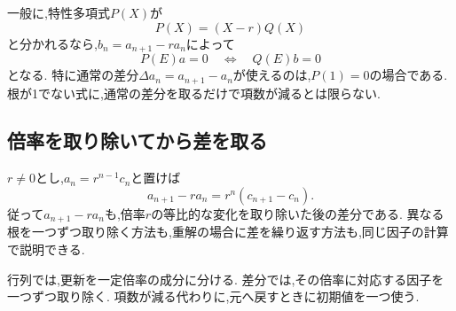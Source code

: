 一般に,特性多項式$P(X)$が
\[
 P(X)=(X-r)Q(X)
\]
と分かれるなら,$b_n=a_{n+1}-ra_n$によって
\[
 P(E)a=0\quad\Longleftrightarrow\quad Q(E)b=0
\]
となる. 特に通常の差分$\Delta a_n=a_{n+1}-a_n$が使えるのは,$P(1)=0$の場合である.
根が1でない式に,通常の差分を取るだけで項数が減るとは限らない.

\subsection{倍率を取り除いてから差を取る}

$r\ne0$とし,$a_n=r^{n-1}c_n$と置けば
\[
 a_{n+1}-ra_n=r^n(c_{n+1}-c_n).
\]
従って$a_{n+1}-ra_n$も,倍率$r$の等比的な変化を取り除いた後の差分である.
異なる根を一つずつ取り除く方法も,重解の場合に差を繰り返す方法も,同じ因子の計算で説明できる.

\begin{bookpoint}
行列では,更新を一定倍率の成分に分ける.
差分では,その倍率に対応する因子を一つずつ取り除く.
項数が減る代わりに,元へ戻すときに初期値を一つ使う.
\end{bookpoint}

